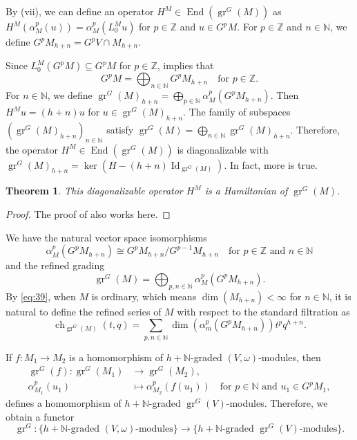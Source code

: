 \documentclass[a4paper, 12pt, reqno]{amsart}
\newtheorem{theorem}{Theorem}[section]
\theoremstyle{remark}
\numberwithin{equation}{subsection}
\DeclareMathOperator{\Id}{Id}
\DeclareMathOperator{\gr}{gr}
\DeclareMathOperator{\End}{End}
\DeclareMathOperator{\ch}{ch}
\begin{document}
By (vii), we can define an operator $H^M \in \End(\gr^G(M))$ as $H^M(\alpha_M^p(u)) = \alpha_M^p(L^M_0u)$ for $p \in \mathbb{Z}$ and $u \in G^pM$.
For $p \in \mathbb{Z}$ and $n \in \mathbb{N}$, we define $G^pM_{h + n} = G^pV \cap M_{h + n}$.

Since $L_0^M(G^pM) \subseteq G^pM$ for $p \in \mathbb{Z}$,  implies that
\begin{equation*}
  G^pM = \bigoplus_{n \in \mathbb{N}}G^pM_{h + n} \quad \text{for }p \in \mathbb{Z}.
\end{equation*}
For $n \in \mathbb{N}$, we define $\gr^G(M)_{h + n} = \bigoplus_{p \in \mathbb{N}}\alpha_M^p(G^pM_{h + n})$.
Then $H^Mu = (h + n)u$ for $u \in \gr^G(M)_{h + n}$.
The family of subspaces $(\gr^G(M)_{h + n})_{n \in \mathbb{N}}$ satisfy $\gr^G(M) = \bigoplus_{n \in \mathbb{N}}\gr^G(M)_{h + n}$.
Therefore, the operator $H^M \in \End(\gr^G(M))$ is diagonalizable with $\gr^G(M)_{h + n} = \ker(H - (h + n)\Id_{\gr^G(M)})$.
In fact, more is true.

\begin{theorem}
  \label{thr:51}
  This diagonalizable operator $H^M$ is a Hamiltonian of $\gr^G(M)$.
\end{theorem}

\begin{proof}
  The proof of  also works here.
\end{proof}

We have the natural vector space isomorphisms
\begin{equation*}
  \alpha_M^p(G^pM_{h + n}) \cong G^pM_{h + n}/G^{p - 1}M_{h + n} \quad \text{for }p \in \mathbb{Z}\text{ and }n \in \mathbb{N}
\end{equation*}
and the refined grading
\begin{equation}
  \label{eq:39}
  \gr^G(M) = \bigoplus_{p, n \in \mathbb{N}}\alpha_M^p(G^pM_{h + n}).
\end{equation}
By \eqref{eq:39}, when $M$ is ordinary, which means $\dim(M_{h + n}) < \infty$ for $n \in \mathbb{N}$, it is natural to define the refined series of $M$ with respect to the standard filtration as
\begin{equation*}
  \ch_{\gr^G(M)}(t, q) = \sum_{p, n \in \mathbb{N}}\dim(\alpha_m^p(G^pM_{h + n}))t^pq^{h + n}.
\end{equation*}

If $f: M_1 \to M_2$ is a homomorphism of $h + \mathbb{N}$-graded $(V, \omega)$-modules, then
\begin{align*}
  \gr^G(f): \gr^G(M_1) &\to \gr^G(M_2), \\
  \alpha^p_{M_1}(u_1) &\mapsto \alpha^p_{M_2}(f(u_1)) \quad \text{for }p \in \mathbb{N}\text{ and }u_1 \in G^pM_1,
\end{align*}
defines a homomorphism of $h + \mathbb{N}$-graded $\gr^G(V)$-modules.
Therefore, we obtain a functor
\begin{equation*}
  \gr^G: \{\text{$h + \mathbb{N}$-graded $(V, \omega)$-modules}\} \to \{\text{$h + \mathbb{N}$-graded $\gr^G(V)$-modules}\}.
\end{equation*}
\end{document}
